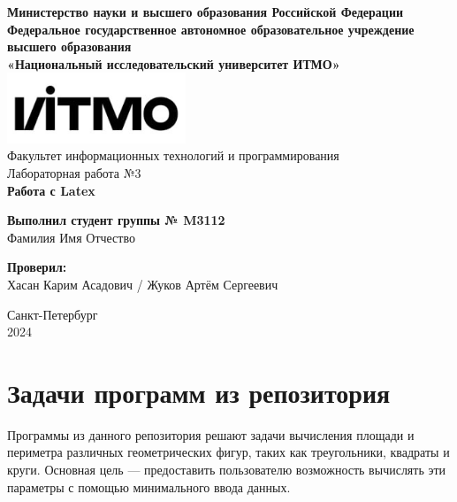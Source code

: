 \documentclass[a4paper, 14pt]{extarticle}
\begin{document}
	
	\begin{titlepage}
		\centering
		\large
		\textbf{Министерство науки и высшего образования Российской Федерации}\\
		\vspace{0.7cm}
		\textbf{Федеральное государственное автономное образовательное учреждение высшего образования}\\
		\textbf{«Национальный исследовательский университет ИТМО»}\\
		\vspace{1.5cm}
		\includegraphics[width=0.4\textwidth]{itmologo.jpg}\\
		\vspace{2cm}
		Факультет информационных технологий и программирования\\
		\vspace{3cm}
		{\normalsize Лабораторная работа №3}\\
		\vspace{0.5cm}
		{\LARGE \textbf{Работа с Latex}}\\
		\vfill
		\hfill
		\begin{flushright}
			\small
			\textbf{Выполнил студент группы № M3112} \\ 
			Фамилия Имя Отчество \\[1cm]
			
			\begin{minipage}{0.4\textwidth}
				\flushright
				\textbf{Проверил:} \\
				Хасан Карим Асадович / Жуков Артём Сергеевич\\
			\end{minipage}
		\end{flushright}
		
		\vfill
		Санкт-Петербург\\
		2024
	\end{titlepage}
	
	\newpage
	
	\tableofcontents
	
	\newpage
	
	\section{Задачи программ из репозитория}
	Программы из данного репозитория решают задачи вычисления площади и периметра различных геометрических фигур, таких как треугольники, квадраты и круги. Основная цель — предоставить пользователю возможность вычислять эти параметры с помощью минимального ввода данных.
	
\end{document}
